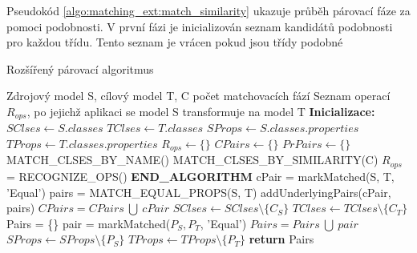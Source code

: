 \documentclass[11pt,twoside,a4paper]{book}
\begin{document}
Pseudokód \ref{algo:matching_ext:match_similarity} ukazuje průběh párovací fáze
za pomoci podobnosti. V první fázi je inicializován seznam kandidátů podobnosti
pro každou třídu. Tento seznam je vrácen  pokud jsou třídy podobné


\begin{algorithm}
 \caption{Rozšířený párovací
 algoritmus}\label{algo:matching_ext}

\begin{algorithmic}[1]
   \Require Zdrojový model S, cílový model T, C počet matchovacích fází
   \Ensure Seznam operací $R_{ops}$, po jejichž aplikaci se model S transformuje
       na model T
   \Statex
   \State \textbf{Inicializace:}
   \State $SClses \gets S.classes$  
   \State $TClses \gets T.classes$ 
   \State $SProps \gets S.classes.properties$ 
   \State $TProps \gets T.classes.properties$ 
   \State $R_{ops} \gets \{\}$
   \State $CPairs \gets \{\}$
   \State $PrPairs \gets \{\}$
   \Statex	   
   \State MATCH\_CLSES\_BY\_NAME()
   \State MATCH\_CLSES\_BY\_SIMILARITY(C)
   \State $R_{ops}$= RECOGNIZE\_OPS()
   \State \textbf{END\_ALGORITHM}
   \Statex
    \label{algo:matching:forEqualCls}
   	        \State cPair = markMatched(S, T, 'Equal') 
   	        \label{algo:matching_ext:make_pair} 
   	        \State  pairs = MATCH\_EQUAL\_PROPS(S, T)
   	        \State  addUnderlyingPairs(cPair, pairs)
   	        \State  $CPairs = CPairs\ \bigcup \ cPair$
   	        \State $SClses \gets SClses \setminus \{ C_S\}$
   	        \State $TClses \gets TClses \setminus \{ C_T\}$   	        
   	     \EndIf
      \EndFor
   \EndFor
  \EndProcedure	      
   \Statex	
   \label{algo:matching_ext:match_equal_props} \State Pairs = \{\}
   	           \State pair = markMatched($P_S, P_T$, 'Equal')
   	           \State $Pairs = Pairs\ \bigcup\ pair$
   	           \State $SProps \gets SProps \setminus \{ P_S\}$
   	           \State $TProps \gets TProps \setminus \{ P_T\}$
   	        \EndIf
   	      \EndFor
   	   \EndFor
   	   \State \textbf{return } Pairs
   \EndProcedure  
\end{algorithmic}
\end{algorithm}
\end{document}
